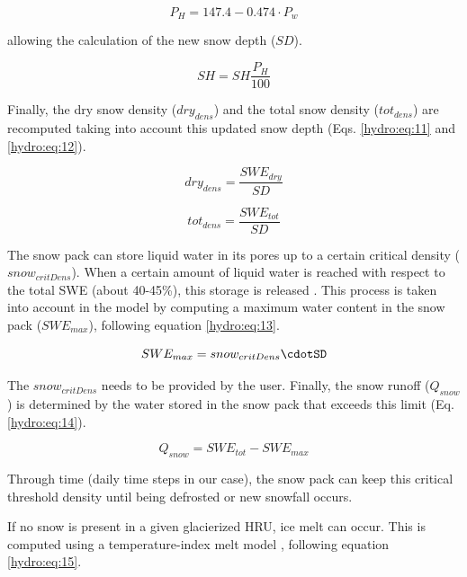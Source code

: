 \begin{equation} \label{hydro:eq:9}
 P_{H} = 147.4 - 0.474 \cdot P_{w}
\end{equation} 

allowing the calculation of the new snow depth ($SD$).

\begin{equation} \label{hydro:eq:10}
SH = SH\frac{P_{H}}{100}
\end{equation} 

Finally, the dry snow density ($dry_{dens}$) and the total snow density ($tot_{dens}$) are recomputed taking into account this updated snow depth (Eqs. \ref{hydro:eq:11} and \ref{hydro:eq:12}). 

\begin{equation} \label{hydro:eq:11}
dry_{dens} = \frac{SWE_{dry}}{SD}
\end{equation} 

\begin{equation} \label{hydro:eq:12}
tot_{dens} = \frac{SWE_{tot}}{SD}
\end{equation} 

The snow pack can store liquid water in its pores up to a certain critical density ($snow_{critDens}$). When a certain amount of liquid water is reached with respect to the total SWE (about 40-45\%), this storage is released \citep{bertle_effect_1966}. This process is taken into account in the model by computing a maximum water content in the snow pack ($SWE_{max}$), following equation \ref{hydro:eq:13}.

\begin{equation} \label{hydro:eq:13}
SWE_{max} = snow_{critDens}\cdotSD
\end{equation} 

The $snow_{critDens}$ needs to be provided by the user. Finally, the snow runoff ($Q_{snow}$) is determined by the water stored in the snow pack that exceeds this limit (Eq.\ref{hydro:eq:14}).

\begin{equation} \label{hydro:eq:14}
Q_{snow} = SWE_{tot} - SWE_{max}
\end{equation} 

Through time (daily time steps in our case), the snow pack can keep this critical threshold density until being defrosted or new snowfall occurs. 

If no snow is present in a given glacierized HRU, ice melt can occur. This is computed using a temperature-index melt model \citep{hock_temperature_2003}, following equation \ref{hydro:eq:15}.

